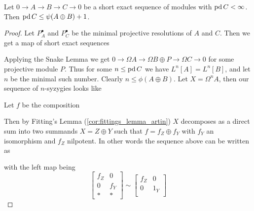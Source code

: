 \begin{theorem}\cite[Theorem~4]{IgTo05} \label{thm:projdim_bounded_by_psi}
	Let $0 \to A \to B \to C \to 0$ be a short exact sequence of modules with $\pd C < \infty$. Then $\pd C \leq \psi(A\oplus B)+1$.
	\begin{proof}
		Let $P_A^\bullet$ and $P_C^\bullet$ be the minimal projective resolutions of $A$ and $C$. Then we get a map of short exact sequences
		\begin{center}
		\end{center}
		Applying the Snake Lemma we get $0 \to \Omega A \to \Omega B \oplus P \to \Omega C \to 0$ for some projective module $P$. Thus for some $n \leq \pd C$ we have $L^n[A] = L^n[B]$, and let $n$ be the minimal such number. Clearly $n \leq \phi(A\oplus B
			)$. Let $X = \Omega^n A$, then our sequence of $n$-syzygies looks like
		\begin{center}
		\end{center}
		Let $f$ be the composition
		Then by Fitting's Lemma (\cref{cor:fittings_lemma_artin}) $X$ decomposes as a direct sum into two summands $X = Z \oplus Y$ such that $f = f_Z \oplus f_Y$ with $f_Y$ an isomorphism and $f_Z$ nilpotent. In other words the sequence above can be written as
		\begin{center}
		\end{center}
		with the left map being
		$$\begin{bmatrix}
			f_Z & 0\\
			0 & f_Y\\
			* & *
		\end{bmatrix} \sim
		\begin{bmatrix}
		f_Z & 0\\
		0 & 1_Y\\

\end{bmatrix}$$
\end{proof}
\end{theorem}
